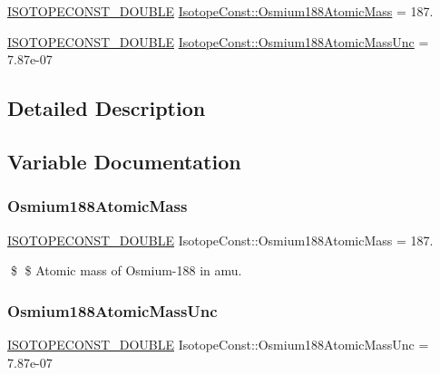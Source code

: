 \begin{DoxyCompactItemize}
\item 
\mbox{\hyperlink{group___isotope_const-_macros_ga8f45a7272ce02c0b4c65c44636ed719a}{I\+S\+O\+T\+O\+P\+E\+C\+O\+N\+S\+T\+\_\+\+D\+O\+U\+B\+LE}} \mbox{\hyperlink{group___isotope_const-_osmium-_os188_ga9d3f4edc72b42b33ca9934ded6001ec2}{Isotope\+Const\+::\+Osmium188\+Atomic\+Mass}} = 187.
\item 
\mbox{\hyperlink{group___isotope_const-_macros_ga8f45a7272ce02c0b4c65c44636ed719a}{I\+S\+O\+T\+O\+P\+E\+C\+O\+N\+S\+T\+\_\+\+D\+O\+U\+B\+LE}} \mbox{\hyperlink{group___isotope_const-_osmium-_os188_ga45023f12041ccc800466c0f58551ed8f}{Isotope\+Const\+::\+Osmium188\+Atomic\+Mass\+Unc}} = 7.\+87e-\/07
\end{DoxyCompactItemize}


\subsection{Detailed Description}


\subsection{Variable Documentation}
\mbox{\label{group___isotope_const-_osmium-_os188_ga9d3f4edc72b42b33ca9934ded6001ec2}} 
\subsubsection{\texorpdfstring{Osmium188\+Atomic\+Mass}{Osmium188AtomicMass}}
{\footnotesize\ttfamily \mbox{\hyperlink{group___isotope_const-_macros_ga8f45a7272ce02c0b4c65c44636ed719a}{I\+S\+O\+T\+O\+P\+E\+C\+O\+N\+S\+T\+\_\+\+D\+O\+U\+B\+LE}} Isotope\+Const\+::\+Osmium188\+Atomic\+Mass = 187.}

\$ \$ Atomic mass of Osmium-\/188 in amu. \mbox{\label{group___isotope_const-_osmium-_os188_ga45023f12041ccc800466c0f58551ed8f}} 
\subsubsection{\texorpdfstring{Osmium188\+Atomic\+Mass\+Unc}{Osmium188AtomicMassUnc}}
{\footnotesize\ttfamily \mbox{\hyperlink{group___isotope_const-_macros_ga8f45a7272ce02c0b4c65c44636ed719a}{I\+S\+O\+T\+O\+P\+E\+C\+O\+N\+S\+T\+\_\+\+D\+O\+U\+B\+LE}} Isotope\+Const\+::\+Osmium188\+Atomic\+Mass\+Unc = 7.\+87e-\/07}

